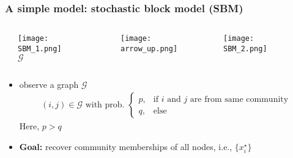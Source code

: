 \documentclass[compress,
mathserif,wide,%
]{beamer}
\begin{document}
\begin{frame}
	\frametitle{A simple model: stochastic block model (SBM)}

\vspace{-1em}


\begin{columns}

\begin{column}{0.05\textwidth}
\end{column}


\begin{column}{0.25\textwidth}
\begin{center}
  \texttt{[image: SBM\_1.png]} \\
	$\mathcal{G}$
\end{center}
\end{column}

\begin{column}{0.05\textwidth}
\end{column}


\begin{column}{0.12\textwidth}
\begin{center}
\texttt{[image: arrow\_up.png]} 
\end{center}
\end{column}


\begin{column}{0.5\textwidth}
\begin{center}
  \texttt{[image: SBM\_2.png]}
\end{center}
\end{column}

\begin{column}{0.03\textwidth}
\end{column}

\end{columns}


\bigskip


\begin{itemize}
	\itemsep0.5em
	
	\item observe a graph $\mathcal{G}$
		\vspace{-0.8em}
		\begin{align*}
			(i,j)\in \mathcal{G} \text{ with prob.~} \begin{cases} p,  & \text{if }i\text{ and }j \text{ are from same community} \\ q, & \text{else} \end{cases}
		\end{align*}
		Here, $p>q$
	\item {\bf Goal:}  recover community memberships  of all nodes, i.e., $\{x_i^{\star}\}$

\end{itemize}

\end{frame}
\end{document}
